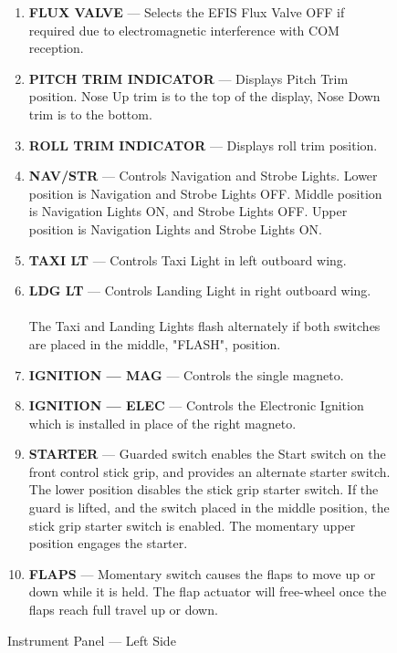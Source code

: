 \begin{figure}
\begin{minipage}{3in}
	\end{minipage}
	\hfill 
	\begin{minipage}{5.6in} 
		\begin{enumerate}
			\item \textbf{FLUX VALVE} --- Selects the EFIS Flux Valve OFF if required due to electromagnetic interference with COM reception. 
			\item \textbf{PITCH TRIM INDICATOR} --- Displays Pitch Trim position. Nose Up trim is to the top of the display, Nose Down trim is to the bottom. 
			\item \textbf{ROLL TRIM INDICATOR} --- Displays roll trim position. 
			\item \textbf{NAV/STR} --- Controls Navigation and Strobe Lights. Lower position is Navigation and Strobe Lights OFF. Middle position is Navigation Lights ON, and Strobe Lights OFF. Upper position is Navigation Lights and Strobe Lights ON. 
			\item \textbf{TAXI LT} --- Controls Taxi Light in left outboard wing. 
			\item \textbf{LDG LT} --- Controls Landing Light in right outboard wing. \\
			\\
			The Taxi and Landing Lights flash alternately if both switches are placed in the middle, "FLASH", position. 
			\item \textbf{IGNITION --- MAG} --- Controls the single magneto. 
			\item \textbf{IGNITION --- ELEC} --- Controls the Electronic Ignition which is installed in place of the right magneto. 
			\item \textbf{STARTER} --- Guarded switch enables the Start switch on the front control stick grip, and provides an alternate starter switch. The lower position disables the stick grip starter switch. If the guard is lifted, and the switch placed in the middle position, the stick grip starter switch is enabled. The momentary upper position engages the starter. 
			\item \textbf{FLAPS} --- Momentary switch causes the flaps to move up or down while it is held. The flap actuator will free-wheel once the flaps reach full travel up or down. 
		\end{enumerate}
	\end{minipage}
\vspace{.5in} \caption{Instrument Panel --- Left Side} \label{left-sub-panel} 
\end{figure}
\FloatBarrier

